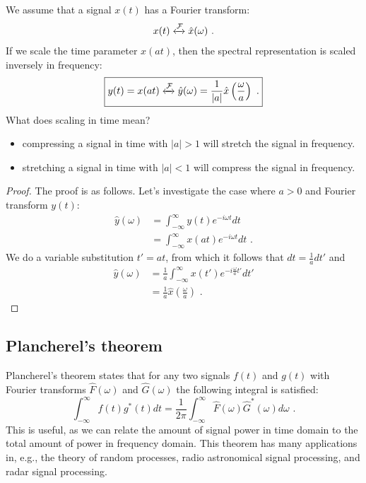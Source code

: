 We assume that a signal $x(t)$ has a Fourier transform:
\begin{align}
x(t) \xleftrightarrow{\mathcal{F}} \hat{x}(\omega)\,\,.
\end{align}
If we scale the time parameter $x(at)$, then the spectral representation is scaled inversely in frequency:
\begin{align}
\boxed{
  y(t) = x(at) \xleftrightarrow{\mathcal{F}} \hat{y}(\omega) = \frac{1}{|a|}\hat{x}\left(\frac{\omega}{a}\right)\,\,.
  \label{eq:timescale_ft_pair}
}
\end{align}
What does scaling in time mean?
\begin{itemize}
\item compressing a signal in time with $|a|>1$ will stretch the signal in frequency.
\item stretching a signal in time with $|a|<1$ will compress the signal in frequency. 
\end{itemize}
\begin{proof}
The proof is as follows. Let's investigate the case where $a > 0$ and Fourier transform $y(t)$:
\begin{align}
\hat{y}(\omega) &= \int_{-\infty}^{\infty} y(t) e^{-i\omega t}dt\\
                &= \int_{-\infty}^{\infty} x(at) e^{-i\omega t}dt\,\,.
\end{align}
We do a variable substitution $t'=at$, from which it follows that $dt=\frac{1}{a}dt'$ and 
\begin{align}
\hat{y}(\omega) &= \frac{1}{a}\int_{-\infty}^{\infty} x(t') e^{-i\frac{\omega}{a} t' }dt'\\
 &= \frac{1}{a}\hat{x}\left(\frac{\omega}{a} \right)\,\,.
\end{align}
\end{proof}







\subsection{Plancherel's theorem}

Plancherel's theorem states that for any two signals $f(t)$ and $g(t)$ with Fourier transforms $\hat{F}(\omega)$ and $\hat{G}(\omega)$ the following integral is satisfied:
\begin{equation}
\boxed{
\int_{-\infty}^{\infty} f(t) g^*(t) dt = \frac{1}{2\pi} \int_{-\infty}^{\infty}  \hat{F}(\omega)\hat{G}^*(\omega) d\omega\,\,.
}
\end{equation}
This is useful, as we can relate the amount of signal power in time domain to the total amount of power in frequency domain. This theorem has many applications in, e.g., the 
theory of random processes, radio astronomical signal processing, and radar signal processing.


